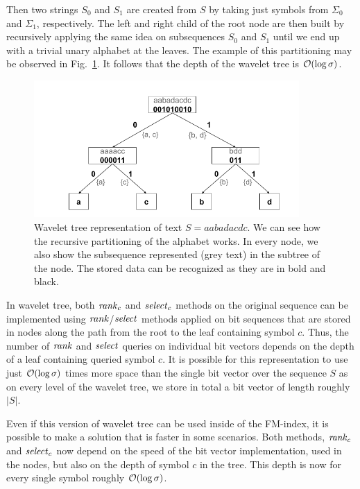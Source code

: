 Then two strings $S_0$ and $S_1$ are created from $S$ by taking just symbols
from $\Sigma_0$ and $\Sigma_1$, respectively. The left and right child of the root node
are then built by recursively applying the same idea on subsequences $S_0$ and $S_1$ until
we end up with a trivial unary alphabet at the leaves. The example of this partitioning may
be observed in Fig.~\ref{obr:WaveletTreeExample}. It follows that the depth of the wavelet
tree is $\mathcal{O}(\log \sigma)$.
\begin{figure}
	\centerline{
		\includegraphics[width=0.9\textwidth, height=0.3\textheight]{images/wavelet_tree}
	}
	\caption[TODO]{Wavelet tree representation of text $S=\mathit{aabadacdc}$. We can see how
	the recursive partitioning of the alphabet works. In every node, we also show the
	subsequence represented (grey text) in the subtree of the node. The stored data can be
	recognized as they are in bold and black.
	}
	\label{obr:WaveletTreeExample}
\end{figure}

In wavelet tree, both $\mathit{rank}_c$ and $\mathit{select}_c$ methods on the original sequence can
be implemented using $\mathit{rank}$/$\mathit{select}$ methods applied on bit sequences that are stored
in nodes along the path from the root to the leaf containing symbol $c$. Thus, the
number of $\mathit{rank}$ and $\mathit{select}$ queries on individual bit vectors depends on the depth of
a leaf containing queried symbol $c$. It is possible for this representation to use
just $\mathcal{O}(\log \sigma)$ times more space than the single bit vector over the sequence $S$
as on every level of the wavelet tree, we store in total a bit vector of length roughly $|S|$.

Even if this version of wavelet tree can be used inside of the FM-index, it is possible to
make a solution that is faster in some scenarios. Both methods, $\mathit{rank}_c$ and $\mathit{select}_c$ now
depend on the speed of the bit vector implementation, used in the nodes, but also on the depth
of symbol $c$ in the tree. This depth is now for every single symbol roughly $\mathcal{O}(\log \sigma)$.

